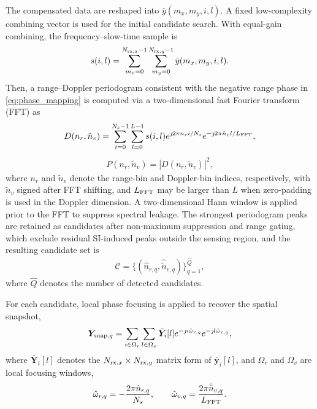 \documentclass[conference]{IEEEtran}
\begin{document}
The compensated data are reshaped into $\bar{y}(m_x,m_y,i,l)$. A fixed low-complexity combining vector is used for the initial candidate search. With equal-gain combining, the frequency--slow-time sample is
\begin{align}
    s(i,l)=
    \sum_{m_x=0}^{N_{{\rm rx},x}-1}\sum_{m_y=0}^{N_{{\rm rx},y}-1}
    \bar{y}(m_x,m_y,i,l).
    \label{eq:spatial_sum}
\end{align}
Then, a range--Doppler periodogram consistent with the negative range phase in \eqref{eq:phase_mapping} is computed via a two-dimensional fast Fourier transform (FFT) as
\begin{align}
    D(n_r,\tilde n_v)=\sum_{i=0}^{N_s-1}\sum_{l=0}^{L-1}s(i,l)
    e^{\jmath2\pi n_ri/N_s}e^{-\jmath2\pi \tilde n_vl/L_{\rm FFT}},
    \label{eq:rd_fft}
\end{align}
\begin{align}
    P(n_r,\tilde n_v)=|D(n_r,\tilde n_v)|^2,
    \label{eq:rd_power}
\end{align}
where $n_r$ and $\tilde n_v$ denote the range-bin and Doppler-bin indices, respectively, with $\tilde n_v$ signed after FFT shifting, and $L_{\rm FFT}$ may be larger than $L$ when zero-padding is used in the Doppler dimension. A two-dimensional Hann window is applied prior to the FFT to suppress spectral leakage. The strongest periodogram peaks are retained as candidates after non-maximum suppression and range gating, which exclude residual SI-induced peaks outside the sensing region, and the resulting candidate set is
\begin{align}
    \mathcal{C}=\{(\hat n_{r,q},\hat{\tilde n}_{v,q})\}_{q=1}^{\hat Q},
\end{align}
where $\hat Q$ denotes the number of detected candidates.

For each candidate, local phase focusing is applied to recover the spatial snapshot,
\begin{align}
    \bm{Y}_{{\rm snap},q}=\sum_{i\in\Omega_r}\sum_{l\in\Omega_v}
    \bar{\bm{Y}}_i[l]
    e^{-\jmath i\hat\omega_{r,q}}e^{-\jmath l\hat\omega_{v,q}},
    \label{eq:snapshot}
\end{align}
where $\bar{\bm{Y}}_i[l]$ denotes the $N_{{\rm rx},x}\times N_{{\rm rx},y}$ matrix form of $\bar{\bm{y}}_i[l]$, and $\Omega_r$ and $\Omega_v$ are local focusing windows,
\begin{align}
    \hat\omega_{r,q}=-\frac{2\pi\hat n_{r,q}}{N_s},\qquad
    \hat\omega_{v,q}=\frac{2\pi\hat{\tilde n}_{v,q}}{L_{\rm FFT}}.
    \label{eq:focused_phases}
\end{align}
\end{document}
